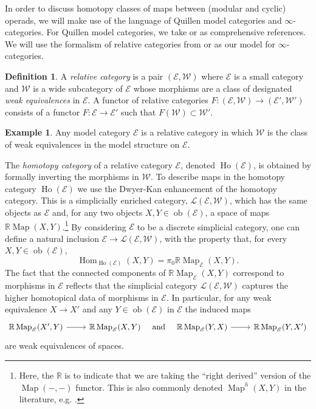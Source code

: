 \documentclass{amsart}
\newcommand{\bE}{\mathscr{E}}
\newcommand{\Hom}{\operatorname{Hom}}
\newcommand{\Ho}{\operatorname{Ho}}
\newcommand{\ob}{\operatorname{ob}}
\newcommand{\Map}{\operatorname{Map}}
\theoremstyle{definition}
\newtheorem{definition}[theorem]{Definition}%
\newtheorem{example}[theorem]{Example}%
\numberwithin{equation}{section}
\begin{document}
\medskip 

In order to discuss homotopy classes of maps between (modular and cyclic) operads, we will make use of the language of Quillen model categories and $\infty$-categories. For Quillen model categories, we take \cite{hirsch} or \cite{balchin} as comprehensive references.  We will use the formalism of relative categories from \cite{barwick_kan} or \cite[Chapter 13]{balchin} as our model for $\infty$-categories. 


\begin{definition}\label{def: relative category}
A \emph{relative category} is a pair $(\bE, \mathscr{W})$ where $\bE$ is a small category and $\mathscr{W}$ is a wide subcategory of $\bE$ whose morphisms are a class of designated \emph{weak equivalences} in $\bE$.   A functor of relative categories $F:(\bE,\mathscr{W})\rightarrow(\bE',\mathscr{W}')$ consists of a functor $F:\bE\rightarrow\bE'$ such that $F(\mathscr{W})\subset \mathscr{W}'$.
\end{definition}

\begin{example}
Any model category $\bE$ is a relative category in which $\mathscr{W}$ is the class of weak equivalences in the model structure on $\bE$.    
\end{example}

The \emph{homotopy category} of a relative category $\bE$, denoted $\Ho(\bE)$, is obtained by formally inverting the morphisms in $\mathscr{W}$.  To describe maps in the homotopy category $\Ho(\bE)$ we use the Dwyer-Kan enhancement of the homotopy category. This is a simplicially enriched category, $\mathcal{L}(\bE,\mathscr{W})$, which has the same objects as $\bE$ and, for any two objects $X,Y\in\ob(\bE)$, a space of maps $\mathbb{R}\Map(X,Y)$.\footnote{Here, the $\mathbb{R}$ is to indicate that we are taking the ``right derived'' version of the $\Map(-,-)$ functor. This is also commonly denoted $\Map^h(X,Y)$ in the literature, e.g. \cite{hirsch}.} By considering $\bE$ to be a discrete simplicial category, one can define a natural inclusion $\bE\rightarrow\mathcal{L}(\bE, \mathscr{W})$, with the property that, for every $X,Y\in\ob(\bE)$, \[\Hom_{\Ho(\bE)}(X,Y) =\pi_0\mathbb{R}\Map_{\bE}(X,Y).\] The fact that the connected components of $\mathbb{R}\Map_{\bE}(X,Y)$ correspond to morphisms in $\bE$ reflects that the simplicial category $\mathcal{L}(\bE,\mathscr{W})$ captures the higher homotopical data of morphisms in $\bE$. In particular, for any weak equivalence $X\rightarrow X'$ and any $Y\in\ob(\bE)$ in $\bE$ the induced maps
\[\begin{tikzcd} \mathbb{R}\Map_{\bE}(X',Y)\arrow[r]& \mathbb{R}\Map_{\bE}(X,Y)\end{tikzcd} \quad \text{and} \quad \begin{tikzcd} \mathbb{R}\Map_{\bE}(Y,X)\arrow[r]& \mathbb{R}\Map_{\bE}(Y,X')\end{tikzcd}\] are weak equivalences of spaces.  
\end{document}
